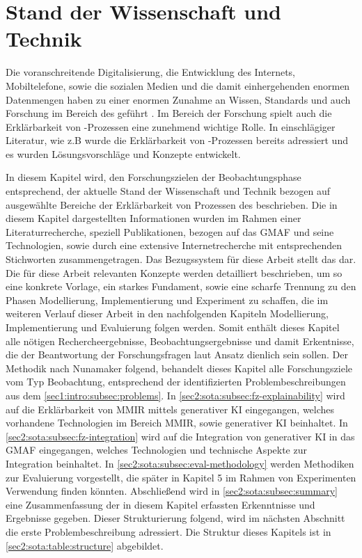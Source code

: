 \section{Stand der Wissenschaft und Technik}
\label{sec2:sota}
Die voranschreitende Digitalisierung, die Entwicklung des Internets, Mobiltelefone, sowie die sozialen Medien und die damit einhergehenden enormen Datenmengen haben zu einer enormen Zunahme an Wissen, Standards und auch Forschung im Bereich des \mmir{} geführt \cite{swa_diss}. 
Im Bereich der Forschung spielt auch die Erklärbarkeit von \mmir{}-Prozessen eine zunehmend wichtige Rolle.
In einschlägiger Literatur, wie z.B \cite{swa_diss} wurde die Erklärbarkeit von \mmir{}-Prozessen bereits adressiert und es wurden Lösungsvorschläge und Konzepte entwickelt.

In diesem Kapitel wird, den Forschungszielen der Beobachtungsphase entsprechend, der aktuelle Stand der Wissenschaft und Technik bezogen auf ausgewählte Bereiche der Erklärbarkeit von Prozessen des \mmir{} beschrieben.
Die in diesem Kapitel dargestellten Informationen wurden im Rahmen einer Literaturrecherche, speziell Publikationen, bezogen auf das GMAF und seine Technologien, sowie durch eine extensive Internetrecherche mit entsprechenden Stichworten zusammengetragen. 
Das Bezugssystem für diese Arbeit stellt das \gmaf{} dar.
Die für diese Arbeit relevanten Konzepte werden detailliert beschrieben, um so eine konkrete Vorlage, ein starkes Fundament, sowie eine scharfe Trennung zu den Phasen Modellierung, Implementierung und Experiment zu schaffen, die im weiteren Verlauf dieser Arbeit in den nachfolgenden Kapiteln Modellierung, Implementierung und Evaluierung folgen werden. 
Somit enthält dieses Kapitel alle nötigen Rechercheergebnisse, Beobachtungsergebnisse und damit Erkentnisse, die der Beantwortung der Forschungsfragen laut Ansatz dienlich sein sollen.
Der Methodik nach Nunamaker \cite{nunamaker} folgend, behandelt dieses Kapitel alle Forschungsziele vom Typ Beobachtung, entsprechend der identifizierten Problembeschreibungen aus dem \cref{sec1:intro:subsec:problems}.
In \cref{sec2:sota:subsec:fz-explainability} wird auf die Erklärbarkeit von MMIR mittels generativer KI eingegangen, welches vorhandene Technologien im Bereich MMIR, sowie generativer KI beinhaltet.
In \cref{sec2:sota:subsec:fz-integration} wird auf die Integration von generativer KI in das GMAF eingegangen, welches Technologien und technische Aspekte zur Integration beinhaltet.
In \cref{sec2:sota:subsec:eval-methodology} werden Methodiken zur Evaluierung vorgestellt, die später in Kapitel 5 im Rahmen von Experimenten Verwendung finden könnten.
Abschließend wird in \cref{sec2:sota:subsec:summary} eine Zusammenfassung der in diesem Kapitel erfassten Erkenntnisse und Ergebnisse gegeben.
Dieser Strukturierung folgend, wird im nächsten Abschnitt die erste Problembeschreibung adressiert.
Die Struktur dieses Kapitels ist in \cref{sec2:sota:table:structure} abgebildet.


